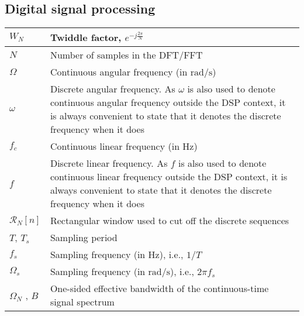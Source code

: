 \documentclass{article}
\begin{document}
\subsection{Digital signal processing}
\begin{xltabular}{\textwidth}{XX}
	\(W_N\)                                     & Twiddle factor, \(e^{-j\frac{2\pi}{N}}\) \cite{ingleDigitalSignalProcessing2000}            \\ \hline
	\(N\)                                     & Number of samples in the DFT/FFT                                                              \\ \hline
	\(\Omega\) \cite{ingleDigitalSignalProcessing2000}                                      & Continuous angular frequency (in \(\si{\radian\per\second}\))                                                               \\ \hline
	\(\omega\)                                     & Discrete angular frequency. As \(\omega\) is also used to denote continuous angular frequency outside the DSP context, it is always convenient to state that it denotes the discrete frequency when it does                                                                \\ \hline
	\(f_c\)                                     & Continuous linear frequency (in \(\si{\hertz}\))                                                               \\ \hline
	\(f\)                                     & Discrete linear frequency. As \(f\) is also used to denote continuous linear frequency outside the DSP context, it is always convenient to state that it denotes the discrete frequency when it does                                                                \\ \hline
    \(\mathcal{R}_N [n]\) & Rectangular window used to cut off the discrete sequences \cite{ingleDigitalSignalProcessing2000} \\ \hline
    \(T\)\cite{oppenheimDiscreteTimeSignalProcessing2009}, \(T_s\) & Sampling period \\ \hline
    \(f_s\) & Sampling frequency (in \(\si{\hertz}\)), i.e., \(1/T\) \\ \hline
    \(\Omega_s\) & Sampling frequency (in \(\si{\radian\per\second}\)), i.e., \(2\pi f_s\) \\ \hline
    \(\Omega_N\) \cite{oppenheimDiscreteTimeSignalProcessing2009}, \(B\) & One-sided effective bandwidth of the continuous-time signal spectrum \\ \hline

\end{xltabular}
\end{document}
